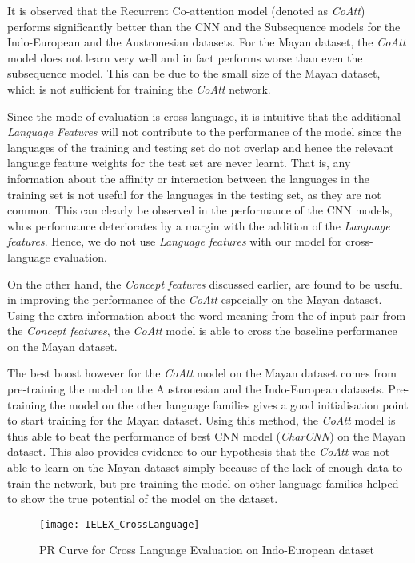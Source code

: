 It is observed that the Recurrent Co-attention model (denoted as \textit{CoAtt}) performs significantly better than the CNN \citep{rama2016siamese} and the Subsequence \citep{rama2015automatic} models for the Indo-European and the Austronesian datasets. For the Mayan dataset, the \textit{CoAtt} model does not learn very well and in fact performs worse than even the subsequence model. This can be due to the small size of the Mayan dataset, which is not sufficient for training the \textit{CoAtt} network. 

Since the mode of evaluation is cross-language, it is intuitive that the additional \textit{Language Features} will not contribute to the performance of the model since the languages of the training and testing set do not overlap and hence the relevant language feature weights for the test set are never learnt. That is, any information about the affinity or interaction between the languages in the training set is not useful for the languages in the testing set, as they are not common. This can clearly be observed in the performance of the CNN models, whos performance deteriorates by a margin with the addition of the \textit{Language features}. Hence, we do not use \textit{Language features} with our model for cross-language evaluation.

On the other hand, the \textit{Concept features} discussed earlier, are found to be useful in improving the performance of the \textit{CoAtt} especially on the Mayan dataset. Using the extra information about the word meaning from the of input pair from the \textit{Concept features}, the \textit{CoAtt} model is able to cross the baseline performance on the Mayan dataset.

The best boost however for the \textit{CoAtt} model on the Mayan dataset comes from pre-training the model on the Austronesian and the Indo-European datasets. Pre-training the model on the other language families gives a good initialisation point to start training for the Mayan dataset. Using this method, the \textit{CoAtt} model is thus able to beat the performance of best CNN model (\textit{CharCNN}) on the Mayan dataset. This also provides evidence to our hypothesis that the \textit{CoAtt} was not able to learn on the Mayan dataset simply because of the lack of enough data to train the network, but pre-training the model on other language families helped to show the true potential of the model on the dataset.

\begin{figure}[ht]
	\centering
	\texttt{[image: IELEX\_CrossLanguage]}
    \caption{PR Curve for Cross Language Evaluation on Indo-European dataset}
    \label{CoAttNet}
\end{figure}

